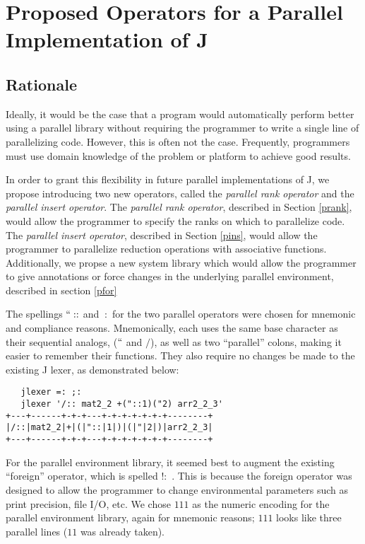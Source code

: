 \chapter{Proposed Operators for a Parallel Implementation of J} %
\label{paraop}

\section{Rationale}
Ideally, it would be the case that a program would automatically perform better using a parallel library 
without requiring the programmer to write a single line of parallelizing code. 
However, this is often not the case. %
Frequently, programmers must use domain knowledge of the problem or platform to achieve good results. 

In order to grant this flexibility in future parallel implementations of J, 
we propose introducing two new operators, called the \textit{parallel rank operator} 
and the \textit{parallel insert operator}.
The \textit{parallel rank operator}, described in Section \ref{prank}, 
would allow the programmer to specify the ranks on which to parallelize code.
The \textit{parallel insert operator}, described in Section \ref{pins}, 
would allow the programmer to parallelize reduction operations with associative functions.
Additionally, we propse a new system library
which would allow the programmer to give annotations or force changes in the underlying parallel environment,
described in section \ref{pfor}

The spellings $``::$ and $\::$ for the two parallel operators were chosen for mnemonic and compliance reasons.
Mnemonically, each uses the same base character as their sequential analogs, ($``$ and $/$), 
as well as two ``parallel'' colons, making it easier to remember their functions.
They also require no changes be made to the existing J lexer\cite{ioj}, 
as demonstrated below:

\begin{verbatim}
   jlexer =: ;:
   jlexer '/:: mat2_2 +("::1)("2) arr2_2_3'
+---+------+-+-+---+-+-+-+-+-+-+--------+
|/::|mat2_2|+|(|"::|1|)|(|"|2|)|arr2_2_3|
+---+------+-+-+---+-+-+-+-+-+-+--------+
\end{verbatim}

For the parallel environment library, 
it seemed best to augment the existing ``foreign'' operator, which is spelled $!:$ .
This is because the foreign operator was designed to 
allow the programmer to change environmental parameters 
such as print precision, file I/O, etc. \cite{jvocab}
We chose $111$ as the numeric encoding for the parallel environment library, again for mnemonic reasons; 
$111$ looks like three parallel lines ($11$ was already taken).

